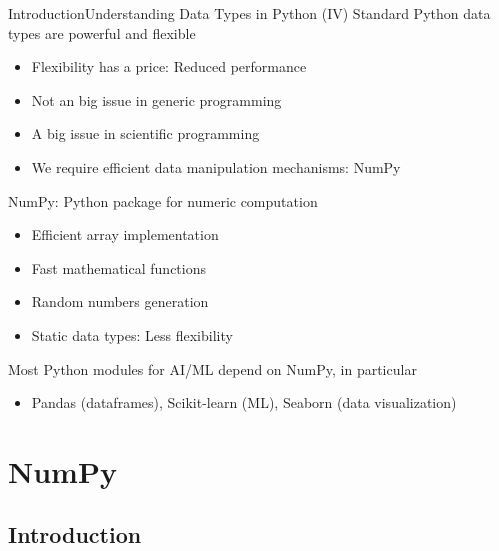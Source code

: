 \documentclass[10pt,compress]{beamer} %
\begin{document}
\begin{frame}[fragile]{Introduction}{Understanding Data Types in Python (IV)}
	Standard Python data types are powerful and flexible
	\begin{itemize}
		\item Flexibility has a price: Reduced performance
		\item Not an big issue in generic programming
		\item A big issue in scientific programming
		\item We require efficient data manipulation mechanisms: NumPy
	\end{itemize}
	NumPy: Python package for numeric computation
	\begin{itemize}
		\item Efficient array implementation
		\item Fast mathematical functions
		\item Random numbers generation
		\item Static data types: Less flexibility
	\end{itemize}
	Most Python modules for AI/ML depend on NumPy, in particular
	\begin{itemize}
		\item Pandas (dataframes), Scikit-learn (ML), Seaborn (data visualization)
	\end{itemize}
\end{frame}

\section{NumPy}
\subsection{Introduction}
\end{document}
